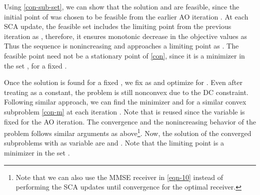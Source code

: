 Using \eqref{con-sub-set}, we can show that the solution  and  are feasible, since the initial point of  was chosen to be feasible from the earlier \ac{AO} iteration . At each \ac{SCA} update, the feasible set includes the limiting point from the previous iteration as , therefore, it ensures monotonic decrease in the objective values \cite{lanckriet2009convergence,scutari_1,quoc2011sequential} as
\iftoggle{single_column}{
\begin{equation} \label{con-convergence}
f(\iter{\mx}{0}{i},\iter{\my}{\ast}{i-1},\iter{\mz}{0}{i}) \geq f(\iter{\mx}{k}{i},\iter{\my}{\ast}{i-1},\iter{\mz}{k}{i}) \geq f(\iter{\mx}{k+1}{i},\iter{\my}{\ast}{i-1},\iter{\mz}{k+1}{i}) \geq f(\iter{\mx}{\ast}{i},\iter{\my}{\ast}{i-1},\iter{\mz}{\ast|\my}{i}). 
\end{equation}}{
\begin{multline} \label{con-convergence}
f(\iter{\mx}{0}{i},\iter{\my}{\ast}{i-1},\iter{\mz}{0}{i}) \geq f(\iter{\mx}{k}{i},\iter{\my}{\ast}{i-1},\iter{\mz}{k}{i}) \\ \geq f(\iter{\mx}{k+1}{i},\iter{\my}{\ast}{i-1},\iter{\mz}{k+1}{i}) \geq f(\iter{\mx}{\ast}{i},\iter{\my}{\ast}{i-1},\iter{\mz}{\ast|\my}{i}). 
\end{multline}}
Thus the sequence  is nonincreasing and approaches a limiting point as . The feasible point  need not be a stationary point of \eqref{con}, since it is a minimizer in the set , for a fixed \me{\my}.

Once the solution is found for a fixed \me{\my}, we fix \me{\mx} as  and optimize for \me{\my}. Even after treating \me{\mx} as a constant, the problem is still nonconvex due to the \ac{DC} constraint. Following similar approach, we can find the minimizer  and  for a similar convex subproblem \eqref{con-m} at each iteration . Note that  is reused since the variable \me{\mx} is fixed for the  \ac{AO} iteration. The convergence and the nonincreasing behavior of the problem follows similar arguments as above\footnote{Note that we can also use the \ac{MMSE} receiver in \eqref{eqn-10} instead of performing the \ac{SCA} updates until convergence for the optimal receiver.}. Now, the solution of the converged subproblems with \me{\my} as variable are  and . Note that the limiting point  is a minimizer in the set .

